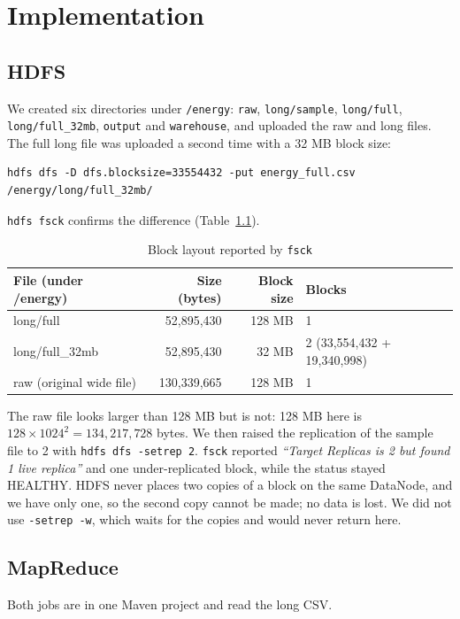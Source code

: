 \documentclass[12pt,a4paper]{report}
\begin{document}
\chapter{Implementation}\label{ch:impl}

\section{HDFS}
We created six directories under \texttt{/energy}: \texttt{raw}, \texttt{long/sample}, \texttt{long/full}, \texttt{long/full\_32mb}, \texttt{output} and \texttt{warehouse}, and uploaded the raw and long files. The full long file was uploaded a second time with a 32 MB block size:
\begin{lstlisting}
hdfs dfs -D dfs.blocksize=33554432 -put energy_full.csv /energy/long/full_32mb/
\end{lstlisting} \texttt{hdfs fsck} confirms the difference (Table~\ref{tab:blocks}).

\begin{table}[H]
\centering\small
\caption{Block layout reported by \texttt{fsck}}\label{tab:blocks}
\begin{tabularx}{\textwidth}{Xrrl}
\toprule
File (under /energy) & Size (bytes) & Block size & Blocks\\
\midrule
long/full & 52,895,430 & 128 MB & 1\\
long/full\_32mb & 52,895,430 & 32 MB & 2 (33,554,432 + 19,340,998)\\
raw (original wide file) & 130,339,665 & 128 MB & 1\\
\bottomrule
\end{tabularx}
\end{table}

The raw file looks larger than 128 MB but is not: 128 MB here is $128 \times 1024^2 = 134{,}217{,}728$ bytes. We then raised the replication of the sample file to 2 with \texttt{hdfs dfs -setrep 2}. \texttt{fsck} reported \emph{``Target Replicas is 2 but found 1 live replica''} and one under-replicated block, while the status stayed HEALTHY. HDFS never places two copies of a block on the same DataNode, and we have only one, so the second copy cannot be made; no data is lost. We did not use \texttt{-setrep -w}, which waits for the copies and would never return here.

\section{MapReduce}
Both jobs are in one Maven project and read the long CSV.
\end{document}
